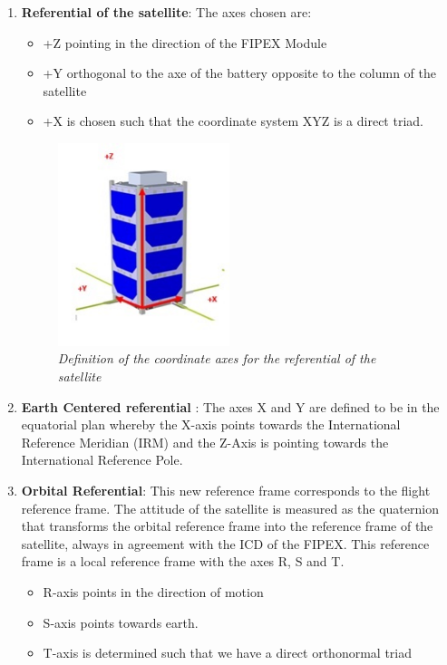 \documentclass[11pt,a4paper]{report}
\begin{document}
\begin{enumerate}
\item 
\textbf{Referential of the satellite}: The axes chosen are: 

\begin{itemize}
\item 
+Z pointing in the direction of the FIPEX Module 
\item 
+Y orthogonal to the axe of the battery opposite to the column of the satellite 
\item 
+X is chosen such that the coordinate system XYZ is a direct triad. 
\end{itemize}

\begin{figure}[!h]
\centering 
\includegraphics[width=5cm]{referential.jpg}
\caption{\textit{Definition of the coordinate axes for the referential of the satellite}}
\label{ref_satellite}
\end{figure}

\item 
\textbf{Earth Centered referential} :  The axes X and Y are defined to be in the equatorial plan whereby the X-axis points towards the International Reference Meridian (IRM) and the Z-Axis is pointing towards the International Reference Pole. 

\item 
\textbf{Orbital Referential}: This new reference frame corresponds to the flight reference frame. The attitude of the satellite is measured as the quaternion that transforms the orbital reference frame into the reference frame of the satellite, always in agreement with the ICD of the FIPEX. This reference frame is a local reference frame with the axes R, S and T. 

\begin{itemize}
\item 
R-axis points in the direction of motion 
\item 
S-axis points towards earth. 
\item 
T-axis is determined such that we have a direct orthonormal triad
\end{itemize}
\end{enumerate}
\end{document}
